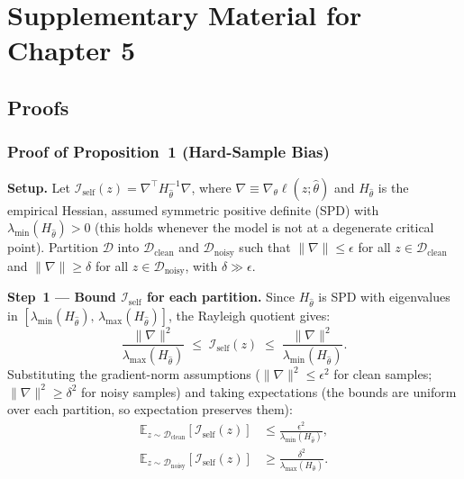 \chapter{Supplementary Material for Chapter 5}
\label{ch:83-appendix-research03}

\section{Proofs}
\label{ch5:app:proofs}

\subsection{Proof of Proposition~1 (Hard-Sample Bias)}
\label{ch5:app:proof-hsb}

\textbf{Setup.}
Let $\mathcal{I}_\text{self}(z) = \nabla^\top H_{\hat\theta}^{-1} \nabla$, where $\nabla \equiv \nabla_\theta \ell(z;\hat\theta)$ and $H_{\hat\theta}$ is the empirical Hessian, assumed symmetric positive definite (SPD) with $\lambda_{\min}(H_{\hat\theta}) > 0$ (this holds whenever the model is not at a degenerate critical point).
Partition $\mathcal{D}$ into $\mathcal{D}_\text{clean}$ and $\mathcal{D}_\text{noisy}$ such that $\|\nabla\| \leq \epsilon$ for all $z \in \mathcal{D}_\text{clean}$ and $\|\nabla\| \geq \delta$ for all $z \in \mathcal{D}_\text{noisy}$, with $\delta \gg \epsilon$.

\textbf{Step~1 --- Bound $\mathcal{I}_\text{self}$ for each partition.}
Since $H_{\hat\theta}$ is SPD with eigenvalues in $[\lambda_{\min}(H_{\hat\theta}),\, \lambda_{\max}(H_{\hat\theta})]$, the Rayleigh quotient gives:
\begin{equation}
    \frac{\|\nabla\|^2}{\lambda_{\max}(H_{\hat\theta})}
    \;\leq\; \mathcal{I}_\text{self}(z)
    \;\leq\; \frac{\|\nabla\|^2}{\lambda_{\min}(H_{\hat\theta})}.
\end{equation}
Substituting the gradient-norm assumptions ($\|\nabla\|^2 \leq \epsilon^2$ for clean samples; $\|\nabla\|^2 \geq \delta^2$ for noisy samples) and taking expectations (the bounds are uniform over each partition, so expectation preserves them):
\begin{align}
    \mathbb{E}_{z \sim \mathcal{D}_\text{clean}}[\mathcal{I}_\text{self}(z)]
        &\leq \frac{\epsilon^2}{\lambda_{\min}(H_{\hat\theta})}, \\
    \mathbb{E}_{z \sim \mathcal{D}_\text{noisy}}[\mathcal{I}_\text{self}(z)]
        &\geq \frac{\delta^2}{\lambda_{\max}(H_{\hat\theta})}.
\end{align}


